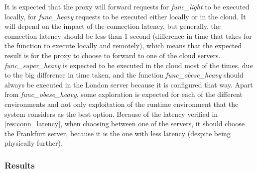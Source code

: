 It is expected that the proxy will forward requests for \textit{func\_light} to be
executed locally, for \textit{func\_heavy} requests to be executed either locally
or in the cloud. It will depend on the impact of the connection latency, but
generally, the connection latency should be less than 1 second (difference in time
that takes for the function to execute locally and remotely), which means that the expected result is for the proxy to choose to forward to one of the cloud servers.
\textit{func\_super\_heavy} is expected to be executed in the cloud most of the
times, due to the big difference in time taken, and the function
\textit{func\_obese\_heavy} should always be executed in the London server because
it is configured that way. Apart from \textit{func\_obese\_heavy}, some
exploration is expected for each of the different environments and not only
exploitation of the runtime environment that the system considers as the best
option. Because of the latency verified in \ref{res:conn_latency}, when choosing
between one of the servers, it should choose the Frankfurt server, because it is
the one with less latency (despite being physically further).

\subsubsection{Results}

